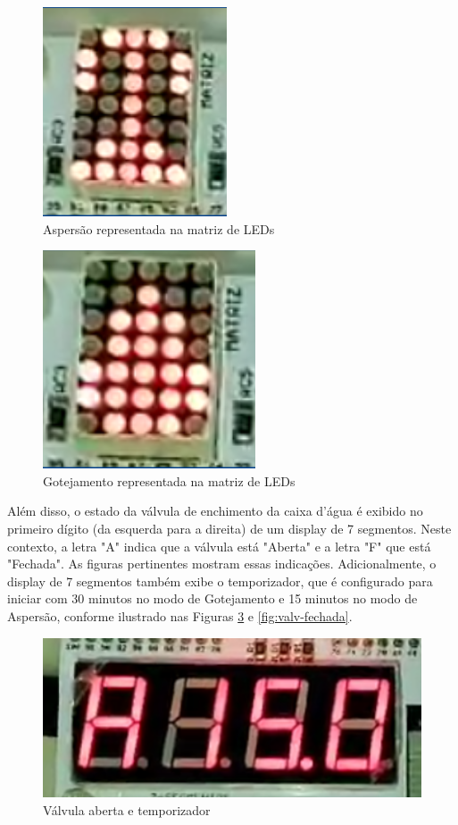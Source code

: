 \documentclass[
	article,			%
	11pt,				%
	oneside,			%
	a4paper,			%
	english,			%
	brazil,				%
	sumario=tradicional
	]{abntex2}
\begin{document}
\begin{figure} [H]
    \centering
    \includegraphics[width=0.3\linewidth]{asp.png}
    \caption{Aspersão representada na matriz de LEDs}
    \label{fig:asp}
\end{figure}

\begin{figure} [H]
    \centering
    \includegraphics[width=0.3\linewidth]{got.png}
    \caption{Gotejamento representada na matriz de LEDs}
    \label{fig:got}
\end{figure}


Além disso, o estado da válvula de enchimento da caixa d'água é exibido no primeiro dígito (da esquerda para a direita) de um display de 7 segmentos. Neste contexto, a letra "A" indica que a válvula está "Aberta" e a letra "F" que está "Fechada". As figuras pertinentes mostram essas indicações. Adicionalmente, o display de 7 segmentos também exibe o temporizador, que é configurado para iniciar com 30 minutos no modo de Gotejamento e 15 minutos no modo de Aspersão, conforme ilustrado nas Figuras \ref{fig:valv-aberta} e \ref{fig:valv-fechada}.

\begin{figure} [H]
    \centering
    \includegraphics[width=0.4\linewidth]{valv-aberta.png}
    \caption{Válvula aberta e temporizador}
    \label{fig:valv-aberta}
\end{figure}
\end{document}
